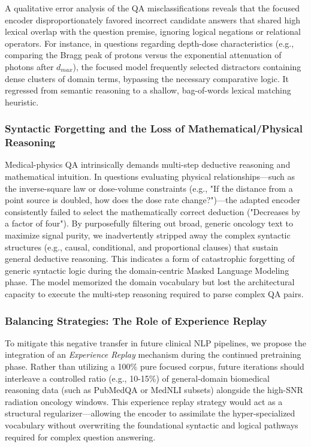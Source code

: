 \documentclass[a4paper,fleqn]{cas-dc}
\begin{document}
A qualitative error analysis of the QA misclassifications reveals that the focused encoder disproportionately favored incorrect candidate answers that shared high lexical overlap with the question premise, ignoring logical negations or relational operators. For instance, in questions regarding depth-dose characteristics (e.g., comparing the Bragg peak of protons versus the exponential attenuation of photons after $d_{max}$), the focused model frequently selected distractors containing dense clusters of domain terms, bypassing the necessary comparative logic. It regressed from semantic reasoning to a shallow, bag-of-words lexical matching heuristic.

\subsubsection{Syntactic Forgetting and the Loss of Mathematical/Physical Reasoning}
Medical-physics QA intrinsically demands multi-step deductive reasoning and mathematical intuition. In questions evaluating physical relationships—such as the inverse-square law or dose-volume constraints (e.g., "If the distance from a point source is doubled, how does the dose rate change?")—the adapted encoder consistently failed to select the mathematically correct deduction ("Decreases by a factor of four"). By purposefully filtering out broad, generic oncology text to maximize signal purity, we inadvertently stripped away the complex syntactic structures (e.g., causal, conditional, and proportional clauses) that sustain general deductive reasoning. This indicates a form of catastrophic forgetting of generic syntactic logic during the domain-centric Masked Language Modeling phase. The model memorized the domain vocabulary but lost the architectural capacity to execute the multi-step reasoning required to parse complex QA pairs.

\subsubsection{Balancing Strategies: The Role of Experience Replay}
To mitigate this negative transfer in future clinical NLP pipelines, we propose the integration of an \textit{Experience Replay} mechanism during the continued pretraining phase. Rather than utilizing a 100\% pure focused corpus, future iterations should interleave a controlled ratio (e.g., 10-15\%) of general-domain biomedical reasoning data (such as PubMedQA or MedNLI subsets) alongside the high-SNR radiation oncology windows. This experience replay strategy would act as a structural regularizer—allowing the encoder to assimilate the hyper-specialized vocabulary without overwriting the foundational syntactic and logical pathways required for complex question answering.
\end{document}
